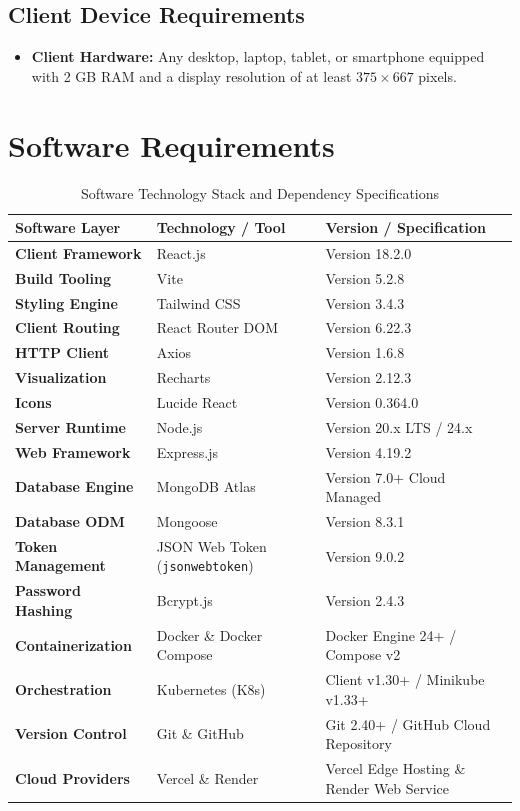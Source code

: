 \subsection{Client Device Requirements}
\begin{itemize}
    \item \textbf{Client Hardware:} Any desktop, laptop, tablet, or smartphone equipped with 2 GB RAM and a display resolution of at least $375 \times 667$ pixels.
\end{itemize}

\section{Software Requirements}
\begin{table}[h!]
\centering
\caption{Software Technology Stack and Dependency Specifications}
\label{tab:software_stack}
\renewcommand{\arraystretch}{1.3}
\begin{tabular}{|p{3.5cm}|p{4.5cm}|p{6cm}|}
\hline
\textbf{Software Layer} & \textbf{Technology / Tool} & \textbf{Version / Specification} \\ \hline
\textbf{Client Framework} & React.js & Version 18.2.0 \\ \hline
\textbf{Build Tooling} & Vite & Version 5.2.8 \\ \hline
\textbf{Styling Engine} & Tailwind CSS & Version 3.4.3 \\ \hline
\textbf{Client Routing} & React Router DOM & Version 6.22.3 \\ \hline
\textbf{HTTP Client} & Axios & Version 1.6.8 \\ \hline
\textbf{Visualization} & Recharts & Version 2.12.3 \\ \hline
\textbf{Icons} & Lucide React & Version 0.364.0 \\ \hline
\textbf{Server Runtime} & Node.js & Version 20.x LTS / 24.x \\ \hline
\textbf{Web Framework} & Express.js & Version 4.19.2 \\ \hline
\textbf{Database Engine} & MongoDB Atlas & Version 7.0+ Cloud Managed \\ \hline
\textbf{Database ODM} & Mongoose & Version 8.3.1 \\ \hline
\textbf{Token Management} & JSON Web Token (\texttt{jsonwebtoken}) & Version 9.0.2 \\ \hline
\textbf{Password Hashing} & Bcrypt.js & Version 2.4.3 \\ \hline
\textbf{Containerization} & Docker \& Docker Compose & Docker Engine 24+ / Compose v2 \\ \hline
\textbf{Orchestration} & Kubernetes (K8s) & Client v1.30+ / Minikube v1.33+ \\ \hline
\textbf{Version Control} & Git \& GitHub & Git 2.40+ / GitHub Cloud Repository \\ \hline
\textbf{Cloud Providers} & Vercel \& Render & Vercel Edge Hosting \& Render Web Service \\ \hline
\end{tabular}
\end{table}

